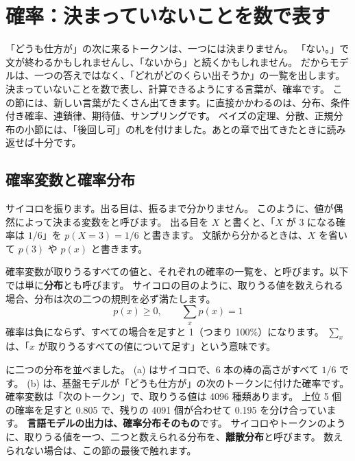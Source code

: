 \section{確率：決まっていないことを数で表す}\label{sec:math-prob}

「どうも仕方が」の次に来るトークンは、一つには決まりません。
「ない。」で文が終わるかもしれませんし、「ないから」と続くかもしれません。
だからモデルは、一つの答えではなく、「どれがどのくらい出そうか」の一覧を出します。
決まっていないことを数で表し、計算できるようにする言葉が、確率です。
この節には、新しい言葉がたくさん出てきます。に直接かかわるのは、分布、条件付き確率、連鎖律、期待値、サンプリングです。
ベイズの定理、分散、正規分布の小節には、「後回し可」の札を付けました。あとの章で出てきたときに読み返せば十分です。

\subsection*{確率変数と確率分布}

サイコロを振ります。出る目は、振るまで分かりません。
このように、値が偶然によって決まる変数をと呼びます。
出る目を $X$ と書くと、「$X$ が 3 になる確率は $1/6$」を $p(X=3)=1/6$ と書きます。
文脈から分かるときは、$X$ を省いて $p(3)$ や $p(x)$ と書きます。

確率変数が取りうるすべての値と、それぞれの確率の一覧を、と呼びます。以下では単に\textbf{分布}とも呼びます。
サイコロの目のように、取りうる値を数えられる場合、分布は次の二つの規則を必ず満たします。
\begin{equation}
p(x)\ge 0,\qquad \sum_{x}p(x)=1
\label{eq:math-prob-axiom}
\end{equation}
確率は負にならず、すべての場合を足すと 1（つまり 100\%）になります。
$\sum_x$ は、「$x$ が取りうるすべての値について足す」という意味です。

に二つの分布を並べました。
(a) はサイコロで、6 本の棒の高さがすべて $1/6$ です。
(b) は、基盤モデルが「どうも仕方が」の次のトークンに付けた確率です。
確率変数は「次のトークン」で、取りうる値は 4096 種類あります。
上位 5 個の確率を足すと 0.805 で、残りの 4091 個が合わせて 0.195 を分け合っています。
\textbf{言語モデルの出力は、確率分布そのもの}です。
サイコロやトークンのように、取りうる値を一つ、二つと数えられる分布を、\textbf{離散分布}と呼びます。
数えられない場合は、この節の最後で触れます。

